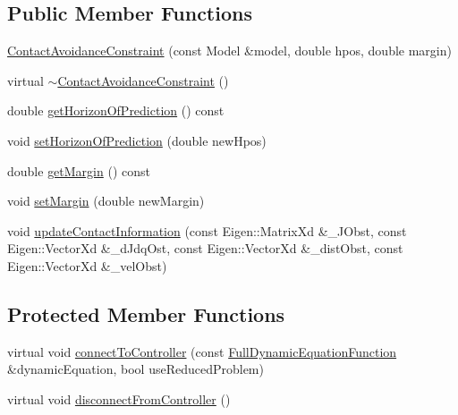 \subsection*{Public Member Functions}
\begin{DoxyCompactItemize}
\item 
\hyperlink{classocra_1_1ContactAvoidanceConstraint_a77ef6f814bddd8ff8eabb9cf1272b4a3}{Contact\+Avoidance\+Constraint} (const Model \&model, double hpos, double margin)
\item 
virtual \hyperlink{classocra_1_1ContactAvoidanceConstraint_a57650df61143b936321c20d582f2457f}{$\sim$\+Contact\+Avoidance\+Constraint} ()
\item 
double \hyperlink{classocra_1_1ContactAvoidanceConstraint_a1282e8f163c4b53da93b435cdd16501f}{get\+Horizon\+Of\+Prediction} () const
\item 
void \hyperlink{classocra_1_1ContactAvoidanceConstraint_a667de1446a83d166c7979b6066dd0720}{set\+Horizon\+Of\+Prediction} (double new\+Hpos)
\item 
double \hyperlink{classocra_1_1ContactAvoidanceConstraint_acb8dff3c7d62c30edc180e3526ee8f94}{get\+Margin} () const
\item 
void \hyperlink{classocra_1_1ContactAvoidanceConstraint_a3504dbfab2c8e829bb73960891f4dd01}{set\+Margin} (double new\+Margin)
\item 
void \hyperlink{classocra_1_1ContactAvoidanceConstraint_a3d44cd52a5de9bc2d69da19b29a5d7f7}{update\+Contact\+Information} (const Eigen\+::\+Matrix\+Xd \&\+\_\+\+J\+Obst, const Eigen\+::\+Vector\+Xd \&\+\_\+d\+Jdq\+Ost, const Eigen\+::\+Vector\+Xd \&\+\_\+dist\+Obst, const Eigen\+::\+Vector\+Xd \&\+\_\+vel\+Obst)
\end{DoxyCompactItemize}
\subsection*{Protected Member Functions}
\begin{DoxyCompactItemize}
\item 
virtual void \hyperlink{classocra_1_1ContactAvoidanceConstraint_a9beada2720203ab46265f271309a2ab5}{connect\+To\+Controller} (const \hyperlink{classocra_1_1FullDynamicEquationFunction}{Full\+Dynamic\+Equation\+Function} \&dynamic\+Equation, bool use\+Reduced\+Problem)
\item 
virtual void \hyperlink{classocra_1_1ContactAvoidanceConstraint_a884358568ff7f5510d26ff96915a4d8c}{disconnect\+From\+Controller} ()
\end{DoxyCompactItemize}
